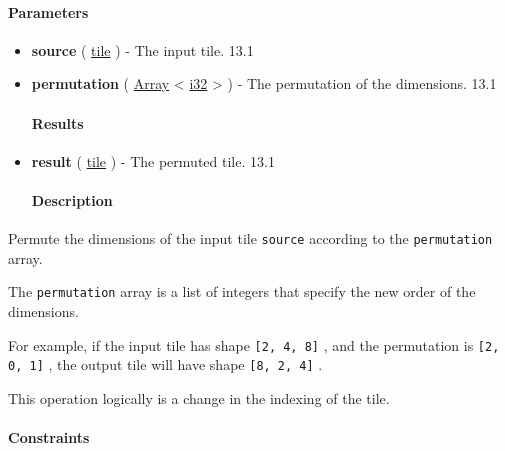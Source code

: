 \documentclass{article}
\begin{document}
\paragraph{Parameters}

\begin{itemize}
\item \textbf{source} ( \href{https://docs.nvidia.com/cuda/tile-ir/latest/sections/types.html#type-tile}{tile} ) - The input tile. 13.1
\item \textbf{permutation} ( \href{https://docs.nvidia.com/cuda/tile-ir/latest/sections/operations.html#type-array}{Array} < \href{https://docs.nvidia.com/cuda/tile-ir/latest/sections/types.html#subsection-element-types}{i32} > ) - The permutation of the dimensions. 13.1


\paragraph{Results}

\item \textbf{result} ( \href{https://docs.nvidia.com/cuda/tile-ir/latest/sections/types.html#type-tile}{tile} ) - The permuted tile. 13.1


\paragraph{Description}

\end{itemize}
Permute the dimensions of the input tile \texttt{source} according to the \texttt{permutation} array.

The \texttt{permutation} array is a list of integers that specify the new order of the dimensions.


For example, if the input tile has shape \texttt{[2, 4, 8]} , and the permutation is \texttt{[2, 0, 1]} , the output tile will have shape \texttt{[8, 2, 4]} .


This operation logically is a change in the indexing of the tile.



\paragraph{Constraints}
\end{document}
